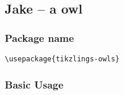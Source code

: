 \documentclass[parskip=half]{scrartcl}
\begin{document}
\begin{tcblisting}{}
\marmot[body=SteelBlue]
\end{tcblisting}

\begin{tcblisting}{}
\marmot[blush]
\end{tcblisting}

\begin{tcblisting}{}
\marmot[whiskers=gray]
\end{tcblisting}

\begin{tcblisting}{}
\marmot[teeth]
\end{tcblisting}

\begin{tcblisting}{}
\marmot[shadow]
\end{tcblisting}

\begin{tcblisting}{}
\marmot[askphil]
\end{tcblisting}

\begin{tcblisting}{}
\marmot[leftstep]
\end{tcblisting}

\begin{tcblisting}{}
\marmot[rightstep]
\end{tcblisting}

\begin{tcblisting}{}
\marmot[3D]
\end{tcblisting}


\clearpage
\subsection{Jake -- a owl}

\subsubsection{Package name}

\begin{tcolorbox}
\vspace*{0.5cm}
\lstinline|\usepackage{tikzlings-owls}|
\vspace*{0.5cm}
\end{tcolorbox}

\subsubsection{Basic Usage}
\end{document}
